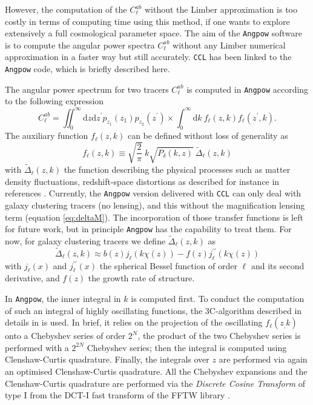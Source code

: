 \documentclass[\docopts]{\docclass}
\newcommand{\ccl}{{\tt CCL}\xspace}
\begin{document}
However, the computation of the $C^{ab}_\ell$ without the Limber approximation is too costly in terms of computing time using this method, if one wants to explore extensively a full cosmological parameter space. The aim of the \texttt{Angpow} software \citep{2017A&A...602A..72C} is to compute the angular power spectra  $C_{\ell}^{ab}$  without any Limber numerical approximation in a faster way but still accurately. \ccl has been linked to the \texttt{Angpow} code,  which is briefly described here.

The angular power spectrum for two tracers $C_{\ell}^{ab}$ is computed in \texttt{Angpow} according to the following expression
\begin{equation}
  C_{\ell}^{ab} = \iint_0^\infty \mathrm{d} z \mathrm{d} z^\prime  p_{z_1}(z_1) p_{z_2}(z^\prime) \times \int_0^\infty \mathrm{d} k\ f_{\ell}(z, k) f_{\ell}(z^\prime, k).
  \label{eq-clz1z2-obs}
\end{equation}
The auxiliary function $f_\ell(z,k)$ can be defined without loss of generality as
\begin{equation}
f_\ell(z,k) \equiv  \sqrt{\frac{2}{\pi}}\  k \sqrt{P_\delta(k,z)}\ \widetilde{\Delta}_\ell(z,k)\label{eq-fell-func}
\end{equation}
with $\widetilde{\Delta}_\ell(z,k)$ the function describing the physical processes such as matter density fluctuations, redshift-space distortions as described for instance in references \citet{2008cmb..book.....D,2009PhRvD..80h3514Y,2010PhRvD..82h3508Y, 2011PhRvD..84d3516C,2011PhRvD..84f3505B}. Currently, the \texttt{Angpow} version delivered with \ccl can only deal with galaxy clustering tracers (no lensing), and this without the magnification lensing term (equation \ref{eq:deltaM}). The incorporation of those transfer functions is left for future work, but in principle \texttt{Angpow} has the capability to treat them. For now, for galaxy clustering tracers we define $\widetilde{\Delta}_\ell(z,k)$ as 
\begin{equation}
 \widetilde{\Delta}_\ell(z,k) \approx b(z) j_\ell(k \chi(z)) - f(z) j_\ell^{\prime\prime}(k \chi(z)) 
\end{equation}
with $j_\ell(x)$ and $j_\ell^{\prime\prime}(x)$ the spherical Bessel function of order $\ell$ and its second derivative, and $f(z)$ the growth rate of structure.

In \texttt{Angpow}, the inner integral in $k$ is computed first. 
To conduct the computation of such an integral of highly oscillating functions, the 3C-algorithm described in details in \citep{2017A&A...602A..72C} is used. In brief, it relies on the projection of the oscillating $f_\ell(z_,k)$ onto a Chebyshev series of order $2^N$, the product of the two Chebyshev series is performed with a $2^{2N}$ Chebyshev series; then the integral is computed using Clenshaw-Curtis quadrature. Finally, the integrals over $z$ are performed via again an optimised Clenshaw-Curtis quadrature. All the Chebyshev expansions and the Clenshaw-Curtis quadrature are performed via the \textit{Discrete Cosine Transform} of type I from the DCT-I fast transform of the FFTW library \citep{FFTW}.
\end{document}

